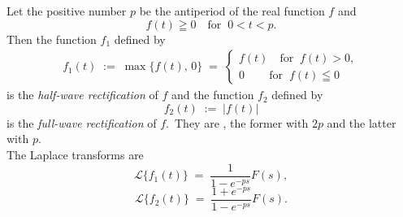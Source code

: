 \documentclass[12pt]{article}
\theoremstyle{definition}
\begin{document}
Let the positive number $p$ be the antiperiod of the real function $f$ and
$$f(t) \geqq 0 \quad \mbox{for} \;\; 0 < t < p.$$
Then the function $f_1$ defined by
\begin{align*}
f_1(t) \;:=\; \max\{f(t),\,0\} \;=\;
\begin{cases}
f(t) \quad \mbox{for} \;\; f(t) > 0,\\
0 \qquad\, \mbox{for} \;\; f(t) \leqq 0
\end{cases}
\end{align*}
is the \emph{half-wave rectification} of $f$ and the function $f_2$ defined by
$$f_2(t) \;:=\; |f(t)|$$
is the \emph{full-wave rectification} of $f$.\, They are , the former with  $2p$ and the latter with  $p$.\\


The Laplace transforms are
$$\mathcal{L}\{f_1(t)\} \;=\; \frac{1}{1\!-\!e^{-ps}}F(s),$$
$$\mathcal{L}\{f_2(t)\} \;=\; \frac{1\!+\!e^{-ps}}{1\!-\!e^{-ps}}F(s).$$


\end{document}

